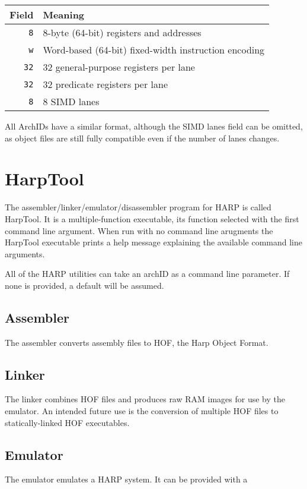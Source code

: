 \documentclass[10pt,letterpaper]{article}
\begin{document}
\begin{center}
\begin{tabular}{rl}
\textbf{Field}&\textbf{Meaning}\\
\hline
\texttt{8} &8-byte (64-bit) registers and addresses\\
\texttt{w} &Word-based (64-bit) fixed-width instruction encoding\\
\texttt{32}&32 general-purpose registers per lane\\
\texttt{32}&32 predicate registers per lane\\
\texttt{8} &8 SIMD lanes\\
\end{tabular}
\end{center}

All ArchIDs have a similar format, although the SIMD lanes field can be omitted, as object files are still fully compatible even if the number of lanes changes. 

\section{HarpTool}
The assembler/linker/emulator/disassembler program for HARP is called HarpTool.
It is a multiple-function executable, its function selected with the first command line argument.
When run with no command line arugments the HarpTool executable prints a help message explaining the available command line arguments.

All of the HARP utilities can take an archID as a command line parameter.
If none is provided, a default will be assumed.

\subsection{Assembler}
The assembler converts assembly files to HOF, the Harp Object Format.

\subsection{Linker}
The linker combines HOF files and produces raw RAM images for use by the emulator.
An intended future use is the conversion of multiple HOF files to statically-linked HOF executables.

\subsection{Emulator}
The emulator emulates a HARP system.
It can be provided with a 
\end{document}
